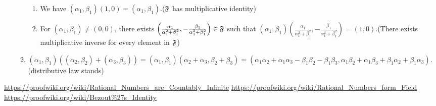 \documentclass{article}
\begin{document}
\begin{enumerate}[label = (\alph*)]
\begin{enumerate}[label=(\Alph*)]
\begin{enumerate}[label=(\arabic*)]
\item We have $(\alpha_1,\beta_1)(1,0) = (\alpha_1,\beta_1)$.($\mathfrak F$ has multiplicative identity)
\item For $(\alpha_1,\beta_1) \ne (0,0)$, there exists $\left(\frac{\alpha_1}{\alpha_1^2+\beta_1^2},-\frac{\beta_1}{\alpha_1^2+\beta_1^2}\right) \in \mathfrak F$ such that $(\alpha_1,\beta_1)\left(\frac{\alpha_1}{\alpha_1^2+\beta_1^2},-\frac{\beta_1}{\alpha_1^2+\beta_1^2}\right) = (1,0)$.(There exists multiplicative inverse for every element in $\mathfrak F$)
\end{enumerate}
\item $(\alpha_1,\beta_1)((\alpha_2,\beta_2) + (\alpha_3,\beta_3)) = (\alpha_1,\beta_1)(\alpha_2+\alpha_3,\beta_2+\beta_3) = (\alpha_1\alpha_2 + \alpha_1\alpha_3-\beta_1\beta_2-\beta_1\beta_3,\alpha_1\beta_2+\alpha_1\beta_3+\beta_1\alpha_2+\beta_1\alpha_3)$.(distributive law stands)
\end{enumerate}
\end{enumerate}

\begin{thebibliography}{9}
 \url{https://proofwiki.org/wiki/Rational_Numbers_are_Countably_Infinite}
 \url{https://proofwiki.org/wiki/Rational_Numbers_form_Field}
 \url{https://proofwiki.org/wiki/Bezout\%27s_Identity}
\end{thebibliography}
\end{document}
